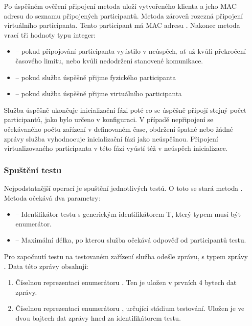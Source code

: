 Po úspěšném ověření připojení metoda uloží vytvořeného klienta a jeho MAC adresu do seznamu připojených participantů. Metoda zároveň rozezná připojení virtuálního participanta. Tento participant má MAC adresu . Nakonec metoda vrací tři hodnoty typu integer:
\begin{itemize}
    \item {} -- pokud připojování participanta vyústilo v neúspěch, ať už kvůli překročení časového limitu, nebo kvůli nedodržení stanovené komunikace.
    \item {} -- pokud služba úspěšně přijme fyzického participanta
    \item {} -- pokud služba úspěšně přijme virtuálního participanta
\end{itemize}

Služba úspěšně ukončuje inicializační fázi poté co se úspěšně připojí stejný počet participantů, jako bylo určeno v konfiguraci. V případě nepřipojení se očekávaného počtu zařízení v definovaném čase, obdržení špatné nebo žádné zprávy služba vyhodnocuje inicializační fázi jako neúspěšnou. Připojení virtualizovaného participanta v této fázi vyústí též v neúspěch inicializace.

\subsubsection{Spuštění testu}

Nejpodstatnější operací je spuštění jednotlivých testů. O toto se stará metoda . Metoda očekává dva parametry:

\begin{itemize}
    \item {} -- Identifikátor testu s generickým identifikátorem T, který typem musí být enumerátor.
    \item {} -- Maximální délka, po kterou služba očekává odpověď od participantů testu. 
\end{itemize}

Pro započnutí testu na testovaném zařízení služba odešle zprávu, s typem zprávy . Data této zprávy obsahují:

\begin{enumerate}
    \item Číselnou reprezentaci enumerátoru . Ten je uložen v prvních 4 bytech dat zprávy.
    \item Číselnou reprezentaci enumerátoru , určující stádium testování. Uložen je ve dvou bajtech dat zprávy hned za identifikátorem testu.
\end{enumerate}

